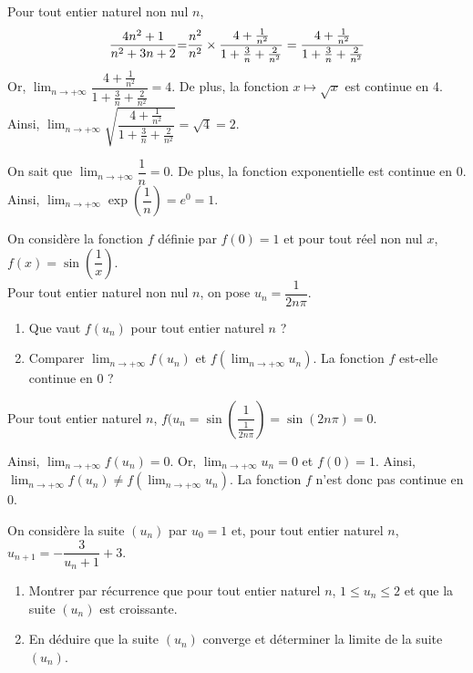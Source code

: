 \documentclass[11pt,fleqn, openany]{book} %
\begin{document}
\begin{solution}Pour tout entier naturel non nul $n$, 
\[\dfrac{4n^2+1}{n^2+3n+2}$=$\dfrac{n^2}{n^2} \times \dfrac{4+\frac{1}{n^2}}{1+\frac{3}{n}+\frac{2}{n^2}}=\dfrac{4+\frac{1}{n^2}}{1+\frac{3}{n}+\frac{2}{n^2}}\]
Or, $\displaystyle \lim_{n \to + \infty} \dfrac{4+\frac{1}{n^2}}{1+\frac{3}{n}+\frac{2}{n^2}} = 4$. De plus, la fonction $x\mapsto \sqrt{x}$ est continue en 4. \\ Ainsi, $\displaystyle \lim_{n \to + \infty} \sqrt{\dfrac{4+\frac{1}{n^2}}{1+\frac{3}{n}+\frac{2}{n^2}}}=\sqrt{4}=2$.

On sait que $\displaystyle \lim_{n \to + \infty} \dfrac{1}{n}=0$. De plus, la fonction exponentielle est continue en 0. \\ Ainsi, $\displaystyle \lim_{n \to + \infty}\exp\left(\dfrac{1}{n}\right)=e^0=1$.\end{solution}




\begin{exercise}[topic=cont02]On considère la fonction $f$ définie par $f(0)=1$ et pour tout réel non nul $x$, $f(x)=\sin\left(\dfrac{1}{x}\right)$. \\ Pour tout entier naturel non nul $n$, on pose $u_n=\dfrac{1}{2n\pi}$.
\begin{enumerate}
\item Que vaut $f(u_n)$ pour tout entier naturel $n$ ?
\item Comparer $\displaystyle\lim_{n \to +\infty}f(u_n)$ et $f(\displaystyle\lim_{n \to + \infty}u_n)$. La fonction $f$ est-elle continue en 0 ?\end{enumerate}\newpage
\end{exercise}


\begin{solution}Pour tout entier naturel $n$, $f(u_n=\sin\left(\dfrac{1}{\frac{1}{2n\pi}}\right)=\sin(2n\pi)=0$.

Ainsi, $\displaystyle\lim_{n \to + \infty}f(u_n)=0$. Or, $\displaystyle\lim_{n\to+\infty}u_n=0$ et $f(0)=1$. Ainsi, $\displaystyle\lim_{n \to +\infty}f(u_n)\neq f(\displaystyle\lim_{n\to+\infty}u_n)$. La fonction $f$ n'est donc pas continue en 0.\end{solution}





\begin{exercise}[topic=cont02]On considère la suite $(u_n)$ par $u_0=1$ et, pour tout entier naturel $n$, $u_{n+1}=-\dfrac{3}{u_n+1}+3$.
\begin{enumerate}
\item Montrer par récurrence que pour tout entier naturel $n$, $1\leqslant u_n\leqslant 2$ et que la suite $(u_n)$ est croissante.
\item En déduire que la suite $(u_n)$ converge et déterminer la limite de la suite $(u_n)$.
\end{enumerate}\end{exercise}
\end{document}
